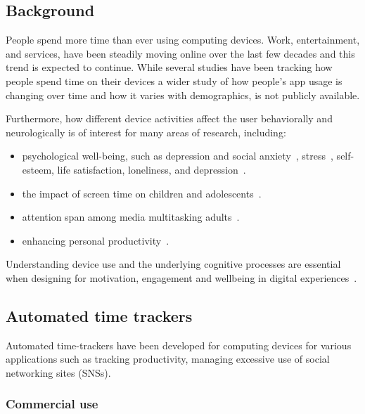 \documentclass{IEEEtran}
\begin{document}
\begin{refsection}
\section{Background}

People spend more time than ever using computing devices. Work, entertainment, and services, have been steadily moving online over the last few decades and this trend is expected to continue.
While several studies have been tracking how people spend time on their devices a wider study of how people's app usage is changing over time and how it varies with demographics, is not publicly available.

Furthermore, how different device activities affect the user behaviorally and neurologically is of interest for many areas of research, including:

\begin{itemize}
    \item psychological well-being, such as depression and social anxiety~\cite{selfhout_different_2009}\cite{shah_nonrecursive_2002}, stress~\cite{mark_stress_2014}, self-esteem, life satisfaction, loneliness, and depression~\cite{huang_time_2017}.
    \item the impact of screen time on children and adolescents~\cite{subrahmanyam_impact_2001}.
    \item attention span among media multitasking adults~\cite{mark_stress_2014}.
    \item enhancing personal productivity~\cite{kim_timeaware_2016}.
\end{itemize}

Understanding device use and the underlying cognitive processes are essential when designing for motivation, engagement and wellbeing in digital experiences~\cite{peters_designing_2018}.

\subsection{Automated time trackers}

Automated time-trackers have been developed for computing devices for various applications such as tracking productivity, managing excessive use of social networking sites (SNSs).

\subsubsection{Commercial use}


\end{refsection}
\end{document}
